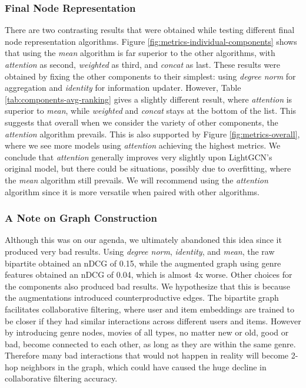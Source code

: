 \documentclass{article}
\begin{document}
\subsubsection{Final Node Representation} \label{final-node-repr-discussion}

There are two contrasting results that were obtained while testing different final node representation algorithms. Figure \ref{fig:metrics-individual-components} shows that using the \textit{mean} algorithm is far superior to the other algorithms, with \textit{attention} as second, \textit{weighted} as third, and \textit{concat} as last. These results were obtained by fixing the other components to their simplest: using \textit{degree norm} for aggregation and \textit{identity} for information updater. However, Table \ref{tab:components-avg-ranking} gives a slightly different result, where \textit{attention} is superior to \textit{mean}, while \textit{weighted} and \textit{concat} stays at the bottom of the list. This suggests that overall when we consider the variety of other components, the \textit{attention} algorithm prevails. This is also supported by Figure \ref{fig:metrics-overall}, where we see more models using \textit{attention} achieving the highest metrics. We conclude that \textit{attention} generally improves very slightly upon LightGCN's original model, but there could be situations, possibly due to overfitting, where the \textit{mean} algorithm still prevails. We will recommend using the \textit{attention} algorithm since it is more versatile when paired with other algorithms.


\subsubsection{A Note on Graph Construction}

Although this was on our agenda, we ultimately abandoned this idea since it produced very bad results. Using \textit{degree norm}, \textit{identity}, and \textit{mean}, the raw bipartite obtained an nDCG of 0.15, while the augmented graph using genre features obtained an nDCG of 0.04, which is almost 4x worse. Other choices for the components also produced bad results. We hypothesize that this is because the augmentations introduced counterproductive edges. The bipartite graph facilitates collaborative filtering, where user and item embeddings are trained to be closer if they had similar interactions across different users and items. However by introducing genre nodes, movies of all types, no matter new or old, good or bad, become connected to each other, as long as they are within the same genre. Therefore many bad interactions that would not happen in reality will become 2-hop neighbors in the graph, which could have caused the huge decline in collaborative filtering accuracy.
\end{document}
